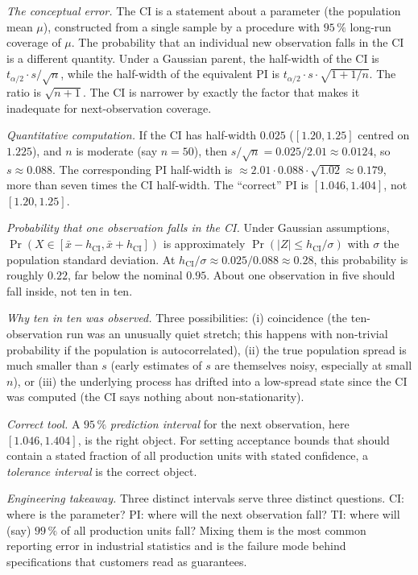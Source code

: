 \textit{The conceptual error.} The CI is a statement about a
parameter (the population mean $\mu$), constructed from a single
sample by a procedure with $95 \,\%$ long-run coverage of $\mu$.
The probability that an individual new observation falls in the CI
is a different quantity. Under a Gaussian parent, the half-width
of the CI is $t_{\alpha/2} \cdot s/\sqrt{n}$, while the half-width
of the equivalent PI is $t_{\alpha/2} \cdot s \cdot \sqrt{1 + 1/n}$.
The ratio is $\sqrt{n + 1}$. The CI is narrower by exactly the
factor that makes it inadequate for next-observation coverage.

\textit{Quantitative computation.} If the CI has half-width
$0.025$ ($[1.20, 1.25]$ centred on $1.225$), and $n$ is moderate
(say $n = 50$), then $s/\sqrt{n} = 0.025/2.01 \approx 0.0124$, so
$s \approx 0.088$. The corresponding PI half-width is
$\approx 2.01 \cdot 0.088 \cdot \sqrt{1.02} \approx 0.179$, more
than seven times the CI half-width. The ``correct'' PI is
$[1.046, 1.404]$, not $[1.20, 1.25]$.

\textit{Probability that one observation falls in the CI.} Under
Gaussian assumptions, $\Pr(X \in [\bar{x} - h_{\text{CI}},
\bar{x} + h_{\text{CI}}])$ is approximately
$\Pr(|Z| \leq h_{\text{CI}}/\sigma)$ with $\sigma$ the population
standard deviation. At $h_{\text{CI}}/\sigma \approx 0.025/0.088
\approx 0.28$, this probability is roughly $0.22$, far below the
nominal $0.95$. About one observation in five should fall inside,
not ten in ten.

\textit{Why ten in ten was observed.} Three possibilities:
(i) coincidence (the ten-observation run was an unusually quiet
stretch; this happens with non-trivial probability if the
population is autocorrelated), (ii) the true population spread is
much smaller than $s$ (early estimates of $s$ are themselves noisy,
especially at small $n$), or (iii) the underlying process has
drifted into a low-spread state since the CI was computed (the
CI says nothing about non-stationarity).

\textit{Correct tool.} A $95 \,\%$ \emph{prediction interval} for
the next observation, here $[1.046, 1.404]$, is the right object.
For setting acceptance bounds that should contain a stated
fraction of all production units with stated confidence, a
\emph{tolerance interval} \cite[ch.~7]{text:devore2015} is the
correct object.

\textit{Engineering takeaway.} Three distinct intervals serve three
distinct questions. CI: where is the parameter? PI: where will the
next observation fall? TI: where will (say) $99 \,\%$ of all
production units fall? Mixing them is the most common reporting
error in industrial statistics and is the failure mode behind
specifications that customers read as guarantees.

